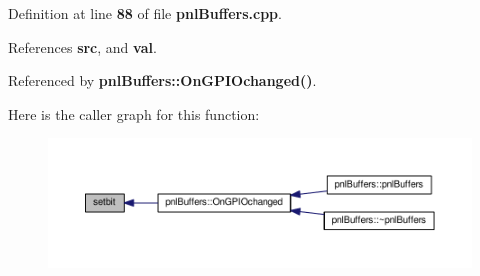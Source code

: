 Definition at line {\bf 88} of file {\bf pnl\+Buffers.\+cpp}.



References {\bf src}, and {\bf val}.



Referenced by {\bf pnl\+Buffers\+::\+On\+G\+P\+I\+Ochanged()}.



Here is the caller graph for this function\+:
\nopagebreak
\begin{figure}[H]
\begin{center}
\leavevmode
\includegraphics[width=350pt]{dc/de0/pnlBuffers_8cpp_a3a2bd98308575bc39835216df52c2e57_icgraph}
\end{center}
\end{figure}


